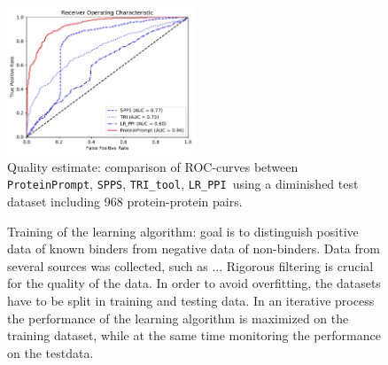 \documentclass{article}
\newcommand{\url}[1]{\texttt{http://\small #1}}
\newcommand{\spps}{\texttt{SPPS}}
\newcommand{\tri}{\texttt{TRI\_tool}}
\newcommand{\lr}{\texttt{LR\_PPI}}
\newcommand{\tool}{\texttt{ProteinPrompt}}
\newcommand{\website}{\url{proteinformatics.org/\tool}}
\begin{document}
\begin{abstract}
Learning algorithms themselves are available in many implementations.
Most prominently in the rise of learning approaches in biology  are artificial neural networks (ANN).
We compared ANNs with support vector machines and several other learning methods.
As a result, we identified the random forrest approach as leading to the cleanest separation of binders and non-binders.

The described procedure resulted in an accurracy far above any other available tool, with the following values:
area under curve of 0.94,
specificity of 0.88
sensitivity: 0.84,
and a total accurracy of 0.86.
Testing was performed on a challenging dataset, as the comparison with other tools shows (see Fig. \ref{fig:comparison}).

\tool\  is available online, free for academic users. The server allows users to scan several databases for potential binders of their query sequence. 
Scanning a query sequence against the human database requires around one minute. 
(The URL will be ready for testing by the time of submission of the full draft.) \\
\noindent \centerline{\website.} \\

\end{abstract}



\begin{figure}
  \centerline{\includegraphics[width=0.5\textwidth]{img/comparison_roc.pdf}}
  \caption{Quality estimate: comparison of ROC-curves between \tool, \spps, \tri, \lr\ using a diminished test dataset including 968 protein-protein pairs.}
  \label{fig:comparison}
\end{figure}


\begin{figure}
  
  \caption{Training of the learning algorithm: goal is to distinguish positive data of known binders from negative data of non-binders. Data from several sources was collected, such as ... Rigorous filtering is crucial for the quality of the data. In order to avoid overfitting, the datasets have to be split in training and testing data. In an iterative process the performance of the learning algorithm is maximized on the training dataset, while at the same time monitoring the performance on the testdata. }
\end{figure}
\end{document}
